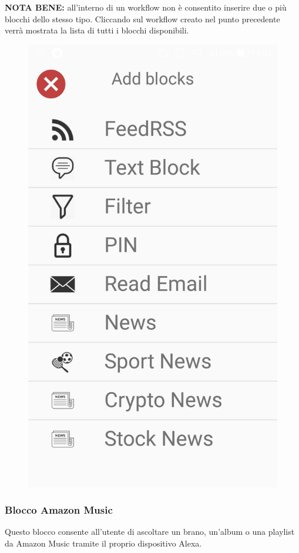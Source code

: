 \textbf{NOTA BENE:} all'interno di un workflow non è consentito inserire due o più blocchi dello stesso tipo.
Cliccando sul workflow creato nel punto precedente verrà mostrata la lista di tutti i blocchi disponibili.

\begin{figure}[!ht]
	\centering
	\includegraphics[scale=0.2]{images/ListBlocks.jpg}
	\caption{}
\end{figure}

\subsubsection{Blocco Amazon Music}
Questo blocco consente all'utente di ascoltare un brano, un'album o una playlist da Amazon Music tramite il proprio dispositivo Alexa.

